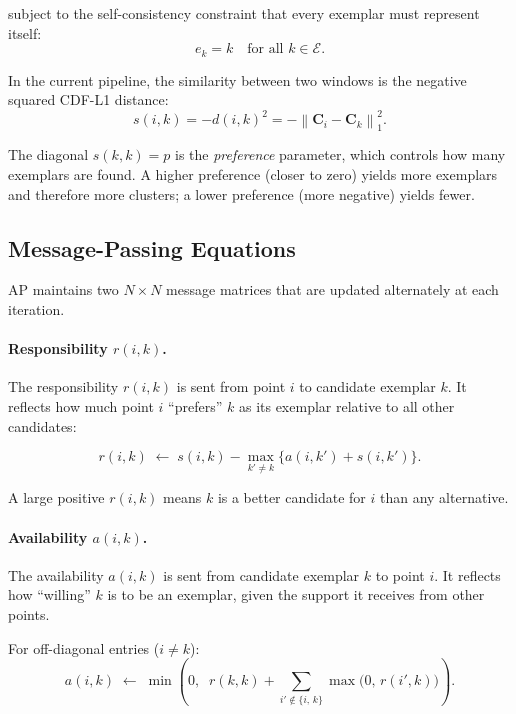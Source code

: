 \documentclass[11pt]{article}
\begin{document}
subject to the self-consistency constraint that every exemplar must represent itself:
\begin{equation}
    e_k = k \quad \text{for all } k \in \mathcal{E}.
\end{equation}

In the current pipeline, the similarity between two windows is the negative squared CDF-L1 distance:
\begin{equation}
    s(i,k) = -d(i,k)^2 = -\left\|\mathbf{C}_i - \mathbf{C}_k\right\|_1^2.
\end{equation}

The diagonal $s(k,k) = p$ is the \textit{preference} parameter, which controls how many exemplars are found. A higher preference (closer to zero) yields more exemplars and therefore more clusters; a lower preference (more negative) yields fewer.

\subsection{Message-Passing Equations}

AP maintains two $N \times N$ message matrices that are updated alternately at each iteration.

\paragraph{Responsibility $r(i,k)$.}
The responsibility $r(i,k)$ is sent from point $i$ to candidate exemplar $k$. It reflects how much point $i$ ``prefers'' $k$ as its exemplar relative to all other candidates:

\begin{equation}
    r(i,k) \;\leftarrow\; s(i,k) - \max_{k' \neq k}\bigl\{a(i,k') + s(i,k')\bigr\}.
\end{equation}

A large positive $r(i,k)$ means $k$ is a better candidate for $i$ than any alternative.

\paragraph{Availability $a(i,k)$.}
The availability $a(i,k)$ is sent from candidate exemplar $k$ to point $i$. It reflects how ``willing'' $k$ is to be an exemplar, given the support it receives from other points.

For off-diagonal entries ($i \neq k$):
\begin{equation}
    a(i,k) \;\leftarrow\; \min\!\left(0,\;\; r(k,k) + \sum_{i' \notin \{i,\,k\}} \max\!\bigl(0,\, r(i',k)\bigr)\right).
\end{equation}
\end{document}
